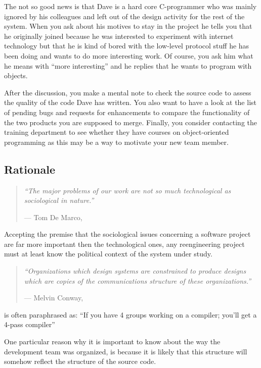 \documentclass[a4paper,10pt,twoside]{book}
\begin{document}
The not so good news is that Dave is a hard core C-programmer who was mainly ignored by his colleagues and left out of the design activity for the rest of the system. When you ask about his motives to stay in the project he tells you that he originally joined because he was interested to experiment with internet technology but that he is kind of bored with the low-level protocol stuff he has been doing and wants to do more interesting work. Of course, you ask him what he means with ``more interesting'' and he replies that he wants to program with objects.

After the discussion, you make a mental note to check the source code to assess the quality of the code Dave has written. You also want to have a look at the list of pending bugs and requests for enhancements to compare the functionality of the two products you are supposed to merge. Finally, you consider contacting the training department to see whether they have courses on object-oriented programming as this may be a way to motivate your new team member.

\subsection*{Rationale}

\begin{quotation}
\noindent
\emph{``The major problems of our work are not so much technological as sociological in nature.''}

\hfill --- Tom De Marco, \cite{DeMa99a}
\end{quotation}

Accepting the premise that the sociological issues concerning a software project are far more important then the technological ones, any reengineering project must at least know the political context of the system under study.

\begin{quotation}
\noindent
\emph{``Organizations which design systems are constrained to produce designs which are copies of the communications structure of these organizations.''}

\hfill --- Melvin Conway, \cite{Conw68a}
\end{quotation}

 is often paraphrased as: ``If you have 4 groups working on a compiler; you'll get a 4-pass compiler''

One particular reason why it is important to know about the way the development team was organized, is because it is likely that this structure will somehow reflect the structure of the source code.
\end{document}
